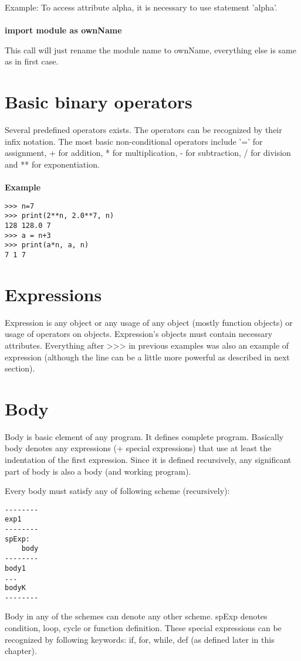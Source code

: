 \documentclass[11pt,oneside]{fithesis2}
\newcommand{\markit}[1]{\ \\\\{\noindent\textbf{#1}}}
\begin{document}
Example: To access attribute alpha, it is necessary to use statement 'alpha'.
\markit{import module as ownName}

This call will just rename the module name to ownName, everything else is same as in first case.

\section{Basic binary operators}
Several predefined operators exists. The operators can be recognized by their infix notation. The most basic non-conditional operators include '=' for assignment, + for addition, * for multiplication, - for subtraction, / for division and ** for exponentiation.
\markit{Example}
\begin{lstlisting}
>>> n=7
>>> print(2**n, 2.0**7, n)
128 128.0 7
>>> a = n+3
>>> print(a*n, a, n)
7 1 7
\end{lstlisting}

\section{Expressions}
Expression is any object or any usage of any object (mostly function objects) or usage of operators on objects. Expression's objects must contain necessary attributes. Everything after >>> in previous examples was also an example of expression (although the line can be a little more powerful as described in next section).

\section{Body}
Body is basic element of any program. It defines complete program. Basically body denotes any expressions (+ special expressions) that use at least the indentation of the first expression. Since it is defined recursively, any significant part of body is also a body (and working program).

Every body must satisfy any of following scheme (recursively):
\begin{lstlisting}
--------
exp1
--------
spExp:
    body
--------
body1
...
bodyK
--------
\end{lstlisting}

Body in any of the schemes can denote any other scheme. spExp denotes condition, loop, cycle or function definition. These special expressions can be recognized by following keywords: if, for, while, def (as defined later in this chapter).
\end{document}
